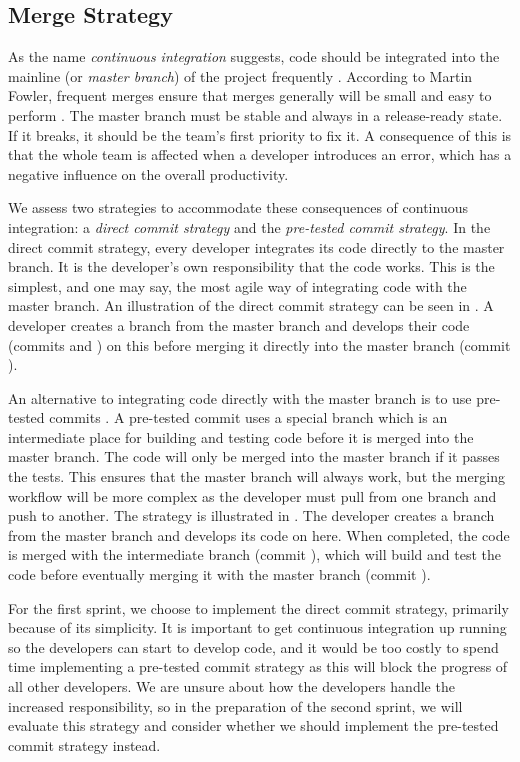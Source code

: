 \subsection{Merge Strategy}\label{sec:branching_strategy}
As the name \emph{continuous integration} suggests, code should be integrated into the mainline (or \emph{master branch}) of the project frequently \parencite{fowlerCI}. According to Martin Fowler, frequent merges ensure that merges generally will be small and easy to perform \parencite{fowlerFeatureBranch}. The master branch must be stable and always in a release-ready state. If it breaks, it should be the team's first priority to fix it. A consequence of this is that the whole team is affected when a developer introduces an error, which has a negative influence on the overall productivity.

We assess two strategies to accommodate these consequences of continuous integration: a \emph{direct commit strategy} and the \emph{pre-tested commit strategy}. In the direct commit strategy, every developer integrates its code directly to the master branch. It is the developer's own responsibility that the code works. This is the simplest, and one may say, the most agile way of integrating code with the master branch. An illustration of the direct commit strategy can be seen in . A developer creates a branch from the master branch and develops their code (commits  and ) on this before merging it directly into the master branch (commit ).

An alternative to integrating code directly with the master branch is to use pre-tested commits \parencite{fowlerPendingHead}. A pre-tested commit uses a special branch which is an intermediate place for building and testing code before it is merged into the master branch. The code will only be merged into the master branch if it passes the tests. This ensures that the master branch will always work, but the merging workflow will be more complex as the developer must pull from one branch and push to another. The strategy is illustrated in . The developer creates a branch from the master branch and develops its code on here. When completed, the code is merged with the intermediate branch (commit \emph{}), which will build and test the code before eventually merging it with the master branch (commit ).

For the first sprint, we choose to implement the direct commit strategy, primarily because of its simplicity. It is important to get continuous integration up running so the developers can start to develop code, and it would be too costly to spend time implementing a pre-tested commit strategy as this will block the progress of all other developers. We are unsure about how the developers handle the increased responsibility, so in the preparation of the second sprint, we will evaluate this strategy and consider whether we should implement the pre-tested commit strategy instead.

